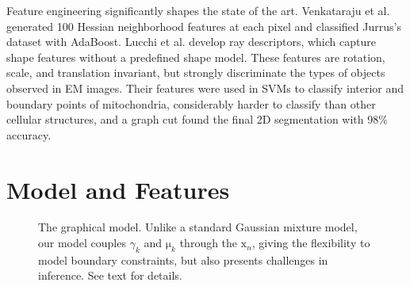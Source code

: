 \documentclass[english]{article}
\newcommand{\plate}[4]{
\begin{pgfonlayer}{b}
\node (invis#1) [draw, color=white, inner sep=6pt,rectangle,fit=#2] {};
\end{pgfonlayer}\begin{pgfonlayer}{f}
\node (capt#1) [ below left=0 pt of invis#1.south east, xshift=1pt,yshift=1pt] {\footnotesize{#3}};
\node (#1) [draw,inner sep=1pt, rectangle,fit=(invis#1) (capt#1),#4] {};
\end{pgfonlayer}
}
\newcommand{\+}[1]{\ensuremath{\boldsymbol{\mathrm{#1}}}}
\begin{document}
Feature engineering significantly shapes the state of the art. Venkataraju et al. \cite{Venkataraju2009} generated 100 Hessian neighborhood features at each pixel and classified Jurrus's dataset with AdaBoost. Lucchi et al. \cite{Lucchi2010} develop ray descriptors, which capture shape features without a predefined shape model. These features are rotation, scale, and translation invariant, but strongly discriminate the types of objects observed in EM images. Their features were used in SVMs to classify interior and boundary points of mitochondria, considerably harder to classify than other cellular structures, and a graph cut found the final 2D segmentation with 98\% accuracy.


\section{Model and Features}
\label{sec:model}
\begin{figure}
\centering

\caption{The graphical model. Unlike a standard Gaussian mixture model, our model couples $\gamma_k$ and $\+\mu_k$ through the $\+x_n$, giving the flexibility to model boundary constraints, but also presents challenges in inference. See text for details.}\label{fig:model}
\end{figure}
\end{document}
